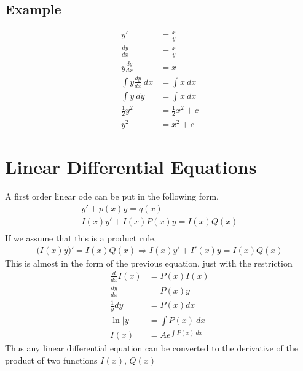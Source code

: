 \documentclass{article}
\theoremstyle{mytheoremstyle}
\theoremstyle{mytheoremstyle}
\theoremstyle{myproblemstyle}
\begin{document}
    \subsection*{Example}
    \begin{align*}
        y' &= \frac{x}{y} \\
        \frac{dy}{dx} &= \frac{x}{y} \\
        y \frac{dy}{dx} &= x \\
        \int y \frac{dy}{dx} \ dx &= \int x \ dx \\
        \int y \ dy &= \int x \ dx \\
        \frac{1}{2} y^2 &= \frac{1}{2} x^2 + c \\
        y^2 &= x^2 + c
    \end{align*}

    \section*{Linear Differential Equations}
    A first order linear ode can be put in the following form.
    \begin{align*}
        y' + p(x)y = q(x) \\
        I(x)y' + I(x)P(x)y = I(x)Q(x) \\
    \end{align*}
    If we assume that this is a product rule,
    \begin{align*}
        \Big(I(x)y\Big)' = I(x)Q(x) \Rightarrow I(x)y' + I'(x)y = I(x)Q(x)
    \end{align*}
    This is almost in the form of the previous equation, just with the
    restriction
    \begin{align*}
        \frac{d}{dx} I(x) &= P(x)I(x) \\
        \frac{dy}{dx} &= P(x)y \\
        \frac{1}{y} dy &= P(x) dx \\
        \ln|y| &= \int P(x) \ dx \\
        I(x) &= Ae^{\int P(x) \ dx}
    \end{align*}
    Thus any linear differential equation can be converted to the derivative of
    the product of two functions $I(x)$, $Q(x)$
\end{document}
